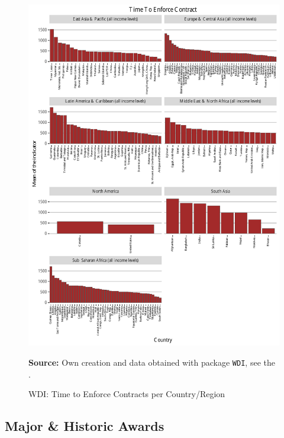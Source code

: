 \begin{figure}[H]
\begin{center}
\caption{WDI: Time to Enforce Contracts per Country/Region}
\label{fig_wdi_time_contract}
\includegraphics[max height=.9\textheight]{../img/wdi_time_to_enforce_contract.pdf}
\end{center}
\noindent \footnotesize{\textbf{Source:} Own creation and data obtained with package \texttt{WDI}, see the \cite{wb_r}.}
\end{figure}


\subsection{Major \& Historic Awards}

